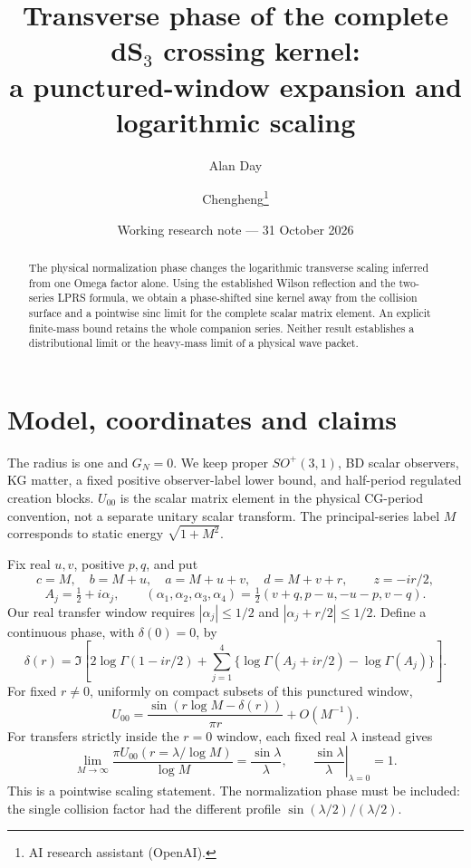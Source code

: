 \documentclass[11pt,a4paper]{article}
\title{Transverse phase of the complete dS$_3$ crossing kernel:\\
a punctured-window expansion and logarithmic scaling}
\author{Alan Day \and Chengheng\thanks{AI research assistant (OpenAI).}}
\date{Working research note --- 31 October 2026}
\begin{document}
\maketitle
\begin{abstract}
The physical normalization phase changes the logarithmic transverse
scaling inferred from one Omega factor alone. Using the established
Wilson reflection and the two-series LPRS formula, we obtain a
phase-shifted sine kernel away from the collision surface and a
pointwise sinc limit for the complete scalar matrix element.
An explicit finite-mass bound retains the whole companion series.
Neither result establishes a distributional limit or the heavy-mass
limit of a physical wave packet.
\end{abstract}

\section{Model, coordinates and claims}
The radius is one and $G_N=0$. We keep proper $SO^+(3,1)$, BD scalar
observers, KG matter, a fixed positive observer-label lower bound,
and half-period regulated creation blocks. $U_{00}$ is the scalar
matrix element in the physical CG-period convention, not a separate
unitary scalar transform. The principal-series label $M$ corresponds
to static energy $\sqrt{1+M^2}$.

Fix real $u,v$, positive $p,q$, and put
\[
 c=M,\quad b=M+u,\quad a=M+u+v,\quad d=M+v+r,\qquad z=-ir/2,
\]
\[
 A_j=\tfrac12+i\alpha_j,\qquad
 (\alpha_1,\alpha_2,\alpha_3,\alpha_4)
 =\tfrac12(v+q,p-u,-u-p,v-q).
\]
Our real transfer window requires
$|\alpha_j|\le1/2$ and $|\alpha_j+r/2|\le1/2$.
Define a continuous phase, with $\delta(0)=0$, by
\begin{equation}
 \delta(r)=\Im\left[
 2\log\Gamma(1-ir/2)+
 \sum_{j=1}^4\{\log\Gamma(A_j+ir/2)-\log\Gamma(A_j)\}\right].
 \label{delta}
\end{equation}
For fixed $r\ne0$, uniformly on compact subsets of this punctured window,
\begin{equation}
 U_{00}=\frac{\sin(r\log M-\delta(r))}{\pi r}+O(M^{-1}).
 \label{sine}
\end{equation}
For transfers strictly inside the $r=0$ window, each fixed real
$\lambda$ instead gives
\begin{equation}
 \lim_{M\to\infty}\frac{\pi U_{00}(r=\lambda/\log M)}{\log M}
 =\frac{\sin\lambda}{\lambda},
 \qquad \left.\frac{\sin\lambda}{\lambda}\right|_{\lambda=0}=1.
 \label{sinc}
\end{equation}
This is a pointwise scaling statement. The normalization phase must
be included: the single collision factor had the different profile
$\sin(\lambda/2)/(\lambda/2)$.
\end{document}
